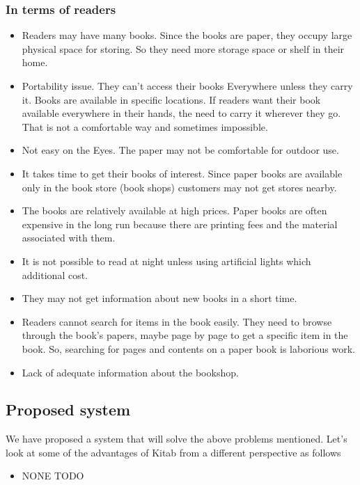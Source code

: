 		\subsubsection{In terms of readers}

\begin{itemize}
	\item Readers may have many books. Since the books are paper, they occupy large physical space for storing. So they need more storage space or shelf in their home.
	\item Portability issue. They can’t access their books Everywhere unless they carry it. Books are available in specific locations. If readers want their book available everywhere in their hands, the need to carry it wherever they go. That is not a comfortable way and sometimes impossible.
	\item Not easy on the Eyes. The paper may not be comfortable for outdoor use.
	\item It takes time to get their books of interest. Since paper books are available only in the book store (book shops) customers may not get stores nearby.
	\item The books are relatively available at high prices. Paper books are often expensive in the long run because there are printing fees and the material associated with them.
	\item It is not possible to read at night unless using artificial lights which additional cost.
	\item They may not get information about new books in a short time.
	\item Readers cannot search for items in the book easily. They need to browse through the book's papers, maybe page by page to get a specific item in the book. So, searching for pages and contents on a paper book is laborious work.
	\item Lack of adequate information about the bookshop.
\end{itemize}

		\subsection{Proposed system}

We have proposed a system that will solve the above problems mentioned. Let’s look at some of the advantages of Kitab from a different perspective as follows

\begin{itemize}
	\item{\Large{NONE TODO}}
\end{itemize}	

